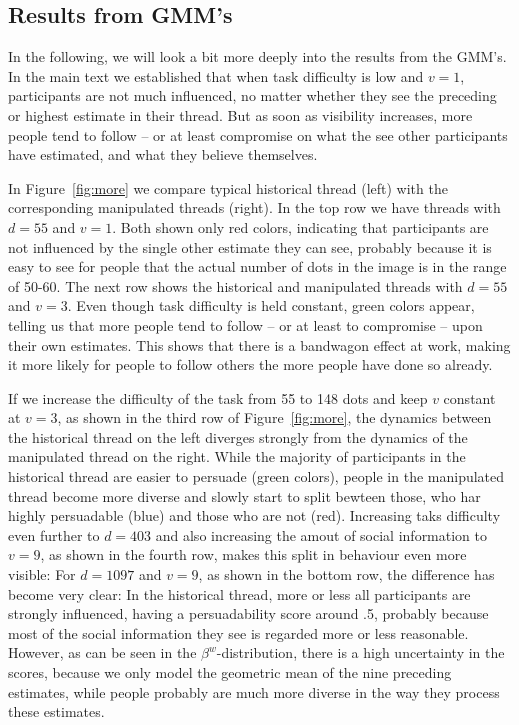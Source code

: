 \documentclass[9pt,twoside,lineno]{pnas-new}
\begin{document}
\subsection*{Results from GMM's}
In the following, we will look a bit more deeply into the results from the GMM's. In the main text we established that when task difficulty is low and $v=1$, participants are not much influenced, no matter whether they see the preceding or highest estimate in their thread. But as soon as visibility increases, more people tend to follow – or at least compromise on what the see other participants have estimated, and what they believe themselves. 

In Figure~\ref{fig:more} we compare typical historical thread (left) with the corresponding manipulated threads (right). In the top row we have threads with $d=55$ and $v=1$. Both shown only red colors, indicating that participants are not influenced by the single other estimate they can see, probably because it is easy to see for people that the actual number of dots in the image is in the range of 50-60. The next row shows the historical and manipulated threads with $d=55$ and $v=3$. Even though task difficulty is held constant, green colors appear, telling us that more people tend to follow – or at least to compromise – upon their own estimates. This shows that there is a bandwagon effect at work, making it more likely for people to follow others the more people have done so already. 

If we increase the difficulty of the task from 55 to 148 dots and keep $v$ constant at $v=3$, as shown in the third row of Figure~\ref{fig:more}, the dynamics between the historical thread on the left diverges strongly from the dynamics of the manipulated thread on the right. While the majority of participants in the historical thread are easier to persuade (green colors), people in the manipulated thread become more diverse and slowly start to split bewteen those, who har highly persuadable (blue) and those who are not (red). Increasing taks difficulty even further to $d=403$ and also increasing the amout of social information to $v=9$, as shown in the fourth row, makes this split in behaviour even more visible: For $d=1097$ and $v=9$, as shown in the bottom row, the difference has become very clear: In the historical thread, more or less all participants are strongly influenced, having a persuadability score around .5, probably because most of the social information they see is regarded more or less reasonable. However, as can be seen in the $\beta^w$-distribution, there is a high uncertainty in the scores, because we only model the geometric mean of the nine preceding estimates, while people probably are much more diverse in the way they process these estimates. 
\end{document}
